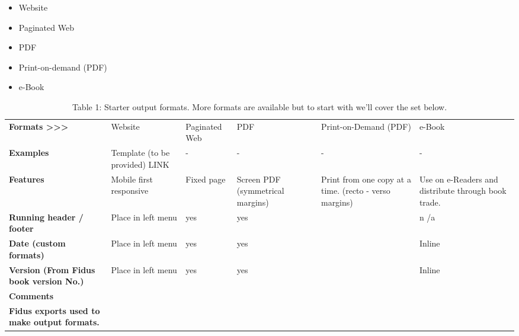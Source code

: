 \documentclass{article}
\begin{document}
\begin{itemize}
\item Website


\item Paginated Web


\item PDF


\item Print-on-demand (PDF)


\item e-Book


\end{itemize}
\begin{table}
\caption*{Table 1: Starter output formats. More formats are available but to start with we'll cover the set below.}\label{T34310601}

\begin{tabu} to \textwidth { |X|X|X|X|X|X| }
\hline



\textbf{Formats >>>} & Website & Paginated Web & PDF & Print-on-Demand (PDF) & e-Book
 \\


\textbf{Examples} & Template (to be provided) LINK & - & - & - & -
 \\


\textbf{Features} & Mobile first responsive & Fixed page & Screen PDF (symmetrical margins) & Print from one copy at a time. (recto - verso margins) & Use on e-Readers and distribute through book trade.
 \\


\textbf{Running header / footer} & Place in left menu & yes & yes &  & n /a
 \\


\textbf{Date (custom formats)} & Place in left menu & yes & yes &  & Inline
 \\


\textbf{Version (From Fidus book version No.)} & Place in left menu & yes & yes &  & Inline
 \\


\textbf{Comments} &  &  &  &  & 
 \\


\textbf{Fidus exports used to make output formats.}  &  &  &  &  & 
 \\
\hline

\end{tabu}\end{table}
\end{document}
